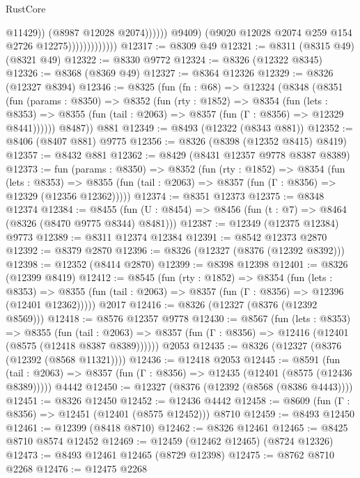 \begin{lexlean}{RustCore}
\begin{coremodule}
                                            @11429))
                                        (@8987 @12028 @2074))))))
                              @9409)
                            (@9020 @12028 @2074 @259 @154 @2726 @12275)))))))))))))
@12317 := @8309 @49
@12321 := @8311 (@8315 @49) (@8321 @49)
@12322 := @8330 @9772
@12324 := @8326 (@12322 @8345)
@12326 := @8368 (@8369 @49)
@12327 := @8364 @12326
@12329 := @8326 (@12327 @8394)
@12346 := @8325
    (fun (fn : @68) =>
    @12324
      (@8348
        (@8351
          (fun (params : @8350) =>
          @8352
            (fun (rty : @1852) =>
            @8354
              (fun (lets : @8353) =>
              @8355 (fun (tail : @2063) => @8357 (fun (Γ : @8356) => @12329 @8441))))))
        @8487))
    @881
@12349 := @8493 (@12322 (@8343 @881))
@12352 := @8406 (@8407 @881) @9775
@12356 := @8326 (@8398 (@12352 @8415) @8419)
@12357 := @8432 @881
@12362 := @8429 (@8431 @12357 @9778 @8387 @8389)
@12373 := fun (params : @8350) =>
  @8352
    (fun (rty : @1852) =>
    @8354
      (fun (lets : @8353) =>
      @8355 (fun (tail : @2063) => @8357 (fun (Γ : @8356) => @12329 (@12356 @12362)))))
@12374 := @8351 @12373
@12375 := @8348 @12374
@12384 := @8455 (fun (U : @8454) => @8456 (fun (t : @7) => @8464 (@8326 (@8470 @9775 @8344) @8481)))
@12387 := @12349 (@12375 @12384) @9773
@12389 := @8311 @12374 @12384
@12391 := @8542 @12373 @2870
@12392 := @8379 @2870
@12396 := @8326 (@12327 (@8376 (@12392 @8392)))
@12398 := @12352 (@8414 @2870)
@12399 := @8398 @12398
@12401 := @8326 (@12399 @8419)
@12412 := @8545
    (fun (rty : @1852) =>
    @8354
      (fun (lets : @8353) =>
      @8355 (fun (tail : @2063) => @8357 (fun (Γ : @8356) => @12396 (@12401 @12362)))))
    @2017
@12416 := @8326 (@12327 (@8376 (@12392 @8569)))
@12418 := @8576 @12357 @9778
@12430 := @8567
    (fun (lets : @8353) =>
    @8355
      (fun (tail : @2063) =>
      @8357 (fun (Γ : @8356) => @12416 (@12401 (@8575 (@12418 @8387 @8389))))))
    @2053
@12435 := @8326 (@12327 (@8376 (@12392 (@8568 @11321))))
@12436 := @12418 @2053
@12445 := @8591
    (fun (tail : @2063) => @8357 (fun (Γ : @8356) => @12435 (@12401 (@8575 (@12436 @8389)))))
    @4442
@12450 := @12327 (@8376 (@12392 (@8568 (@8386 @4443))))
@12451 := @8326 @12450
@12452 := @12436 @4442
@12458 := @8609 (fun (Γ : @8356) => @12451 (@12401 (@8575 @12452))) @8710
@12459 := @8493 @12450
@12461 := @12399 (@8418 @8710)
@12462 := @8326 @12461
@12465 := @8425 @8710 @8574 @12452
@12469 := @12459 (@12462 @12465) (@8724 @12326)
@12473 := @8493 @12461 @12465 (@8729 @12398)
@12475 := @8762 @8710 @2268
@12476 := @12475 @2268

\end{coremodule}
\end{lexlean}
